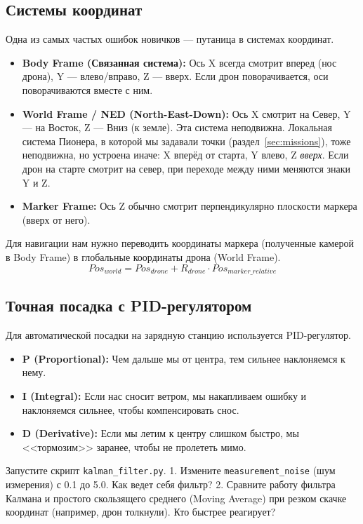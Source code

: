 \subsection{Системы координат}
Одна из самых частых ошибок новичков — путаница в системах координат.

\begin{itemize}
    \item \textbf{Body Frame (Связанная система):} Ось X всегда смотрит вперед (нос дрона), Y — влево/вправо, Z — вверх. Если дрон поворачивается, оси поворачиваются вместе с ним.
    \item \textbf{World Frame / NED (North-East-Down):} Ось X смотрит на Север, Y — на Восток, Z — Вниз (к земле). Эта система неподвижна. Локальная система Пионера, в которой мы задавали точки (раздел~\ref{sec:missions}), тоже неподвижна, но устроена иначе: X вперёд от старта, Y влево, Z \emph{вверх}. Если дрон на старте смотрит на север, при переходе между ними меняются знаки Y и Z.
    \item \textbf{Marker Frame:} Ось Z обычно смотрит перпендикулярно плоскости маркера (вверх от него).
\end{itemize}

Для навигации нам нужно переводить координаты маркера (полученные камерой в Body Frame) в глобальные координаты дрона (World Frame).
$$ Pos_{world} = Pos_{drone} + R_{drone} \cdot Pos_{marker\_relative} $$

\subsection{Точная посадка с PID-регулятором}
Для автоматической посадки на зарядную станцию используется PID-регулятор.
\begin{itemize}
    \item \textbf{P (Proportional):} Чем дальше мы от центра, тем сильнее наклоняемся к нему.
    \item \textbf{I (Integral):} Если нас сносит ветром, мы накапливаем ошибку и наклоняемся сильнее, чтобы компенсировать снос.
    \item \textbf{D (Derivative):} Если мы летим к центру слишком быстро, мы <<тормозим>> заранее, чтобы не пролететь мимо.
\end{itemize}

\begin{taskbox}
Запустите скрипт \texttt{kalman\_filter.py}.
1. Измените \texttt{measurement\_noise} (шум измерения) с 0.1 до 5.0. Как ведет себя фильтр?
2. Сравните работу фильтра Калмана и простого скользящего среднего (Moving Average) при резком скачке координат (например, дрон толкнули). Кто быстрее реагирует?
\end{taskbox}

